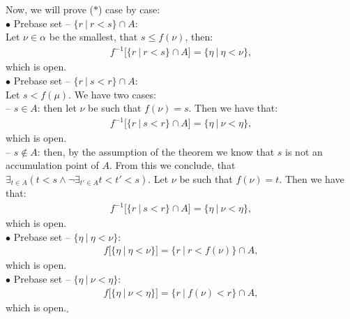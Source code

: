 Now, we will prove ($\ast$) case by case: \\

$\bullet$ Prebase set -- $\{r\ |\ r<s\} \cap A$: \\
Let $\nu \in \alpha$ be the smallest, that $s \leq f(\nu)$, then:
\begin{align*}
f^{-1}[\{r\ |\ r<s\} \cap A] = \{\eta\ |\ \eta<\nu\},
\end{align*}
which is open. \\ 

$\bullet$ Prebase set -- $\{r\ |\ s<r\} \cap A$: \\
Let $s < f(\mu)$. We have two cases: \\
-- $s \in A$: then let $\nu$ be such that $f(\nu)=s$. Then we have that:
\begin{align*}
f^{-1}[\{r\ |\ s<r\} \cap A] = \{\eta\ |\ \nu < \eta \},
\end{align*}
which is open. \\
-- $s \not\in A$: then, by the assumption of the theorem we know that $s$ is not an accumulation 
point of $A$. From this we conclude, that 
$\exists_{t\in A} (t<s \land \neg \exists_{t' \in A} t<t'<s)$. Let $\nu$ be such that $f(\nu) = t$. 
Then we have that:
\begin{align*}
f^{-1}[\{r\ |\ s<r\} \cap A] = \{\eta\ |\ \nu < \eta \},
\end{align*}
which is open. \\

$\bullet$ Prebase set -- $\{\eta\ |\ \eta<\nu\}$: \\
\begin{align*}
f[\{\eta\ |\ \eta<\nu\}] = \{r\ |\ r<f(\nu)\} \cap A,
\end{align*}
which is open. \\

$\bullet$ Prebase set -- $\{\eta\ |\ \nu<\eta\}$: \\
\begin{align*}
f[\{\eta\ |\ \nu<\eta\}] = \{r\ |\ f(\nu)<r\} \cap A,
\end{align*}
which is open.$_\square$






